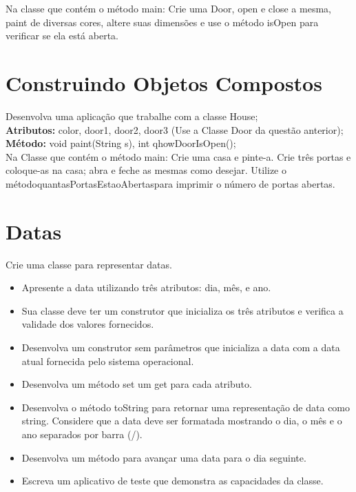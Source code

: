 \documentclass[12pt,a4paper, brazil]{article}
\begin{document}
\par
Na classe que contém o método main: Crie uma Door, open e close a mesma, paint de diversas cores, altere suas dimensões e use o método isOpen para verificar se ela está aberta.

 \dotfill

\section{Construindo Objetos Compostos}
\par
Desenvolva uma aplicação que trabalhe com a classe House;\\
\textbf{Atributos:} color, door1, door2, door3 (Use a Classe Door da questão anterior);\\
\textbf{Método:} void paint(String s), int qhowDoorIsOpen();\\

Na Classe que contém o método main: Crie uma casa e pinte-a. Crie três portas e coloque-as na casa; abra e feche as mesmas como desejar. Utilize o métodoquantasPortasEstaoAbertaspara imprimir o número de portas abertas.

\dotfill

\section{Datas}

\par 
Crie uma classe para representar datas.\\
\begin{itemize}
    \item Apresente a data utilizando três atributos: dia, mês, e ano.\\
    \item Sua classe deve ter um construtor que inicializa os três atributos e verifica a validade dos valores fornecidos.
    \item Desenvolva um construtor sem parâmetros que inicializa a data com a data atual fornecida pelo sistema operacional.
    \item Desenvolva um método set um get para cada atributo.
    \item Desenvolva o método toString para retornar uma representação de data como string. Considere que a data deve ser formatada mostrando o dia, o mês e o ano separados por barra (/).
    \item Desenvolva um método para avançar uma data para o dia seguinte.
    \item Escreva um aplicativo de teste que demonstra as capacidades da classe.
\end{itemize}
\end{document}
